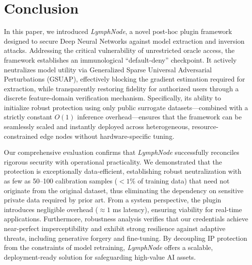 \documentclass[conference]{IEEEtran}
\begin{document}
\section{Conclusion}
\label{sec:conclusion}
In this paper, we introduced \textit{LymphNode}, a novel post-hoc plugin framework designed to secure Deep Neural Networks against model extraction and inversion attacks. Addressing the critical vulnerability of unrestricted oracle access, the framework establishes an immunological ``default-deny'' checkpoint. It actively neutralizes model utility via Generalized Sparse Universal Adversarial Perturbations (GSUAP), effectively blocking the gradient estimation required for extraction, while transparently restoring fidelity for authorized users through a discrete feature-domain verification mechanism. Specifically, its ability to initialize robust protection using only public surrogate datasets—combined with a strictly constant $O(1)$ inference overhead—ensures that the framework can be seamlessly scaled and instantly deployed across heterogeneous, resource-constrained edge nodes without hardware-specific tuning.

Our comprehensive evaluation confirms that \textit{LymphNode} successfully reconciles rigorous security with operational practicality. We demonstrated that the protection is exceptionally data-efficient, establishing robust neutralization with as few as 50--100 calibration samples ($<1\%$ of training data) that need not originate from the original dataset, thus eliminating the dependency on sensitive private data required by prior art. From a system perspective, the plugin introduces negligible overhead ($\approx 1$ ms latency), ensuring viability for real-time applications. Furthermore, robustness analysis verifies that our credentials achieve near-perfect imperceptibility and exhibit strong resilience against adaptive threats, including generative forgery and fine-tuning. By decoupling IP protection from the constraints of model retraining, \textit{LymphNode} offers a scalable, deployment-ready solution for safeguarding high-value AI assets.









\end{document}
